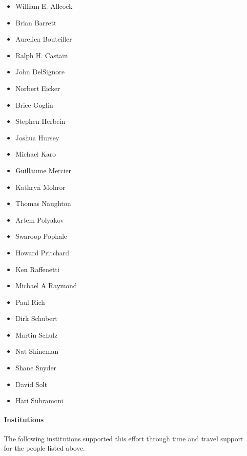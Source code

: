 \begin{itemize}
    \item William E. Allcock
    \item Brian Barrett
    \item Aurelien Bouteiller
    \item Ralph H. Castain
    \item John DelSignore
    \item Norbert Eicker
    \item Brice Goglin
    \item Stephen Herbein
    \item Joshua Hursey
    \item Michael Karo
    \item Guillaume Mercier
    \item Kathryn Mohror
    \item Thomas Naughton
    \item Artem Polyakov
    \item Swaroop Pophale
    \item Howard Pritchard
    \item Ken Raffenetti
    \item Michael A Raymond
    \item Paul Rich
    \item Dirk Schubert
    \item Martin Schulz
    \item Nat Shineman
    \item Shane Snyder
    \item David Solt
    \item Hari Subramoni
\end{itemize}

\paragraph*{Institutions}

The following institutions supported this effort through time and travel support for the people listed above.

